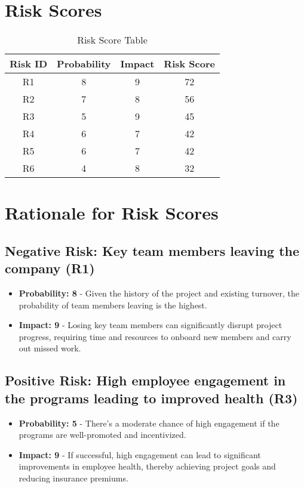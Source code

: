 \pagebreak
\section*{Risk Scores}
\begin{longtable}{|c|c|c|c|}
    \caption{Risk Score Table} \label{tab:title}
    \hline
    \textbf{Risk ID} & \textbf{Probability} & \textbf{Impact} & \textbf{Risk Score} \\
    \hline
    R1 & 8 & 9 & 72 \\
    \hline
    R2 & 7 & 8 & 56 \\
    \hline
    R3 & 5 & 9 & 45 \\
    \hline
    R4 & 6 & 7 & 42 \\
    \hline
    R5 & 6 & 7 & 42 \\
    \hline
    R6 & 4 & 8 & 32 \\
    \hline
\end{longtable}

\section*{Rationale for Risk Scores}

\subsection*{Negative Risk: Key team members leaving the company (R1)}
\begin{itemize}
    \item \textbf{Probability: 8} - Given the history of the project and existing turnover, the probability of team members leaving is the highest. 
    \item \textbf{Impact: 9} - Losing key team members can significantly disrupt project progress, requiring time and resources to onboard new members and carry out missed work.
\end{itemize}

\subsection*{Positive Risk: High employee engagement in the programs leading to improved health (R3)}
\begin{itemize}
    \item \textbf{Probability: 5} - There's a moderate chance of high engagement if the programs are well-promoted and incentivized. 
    \item \textbf{Impact: 9} - If successful, high engagement can lead to significant improvements in employee health, thereby achieving project goals and reducing insurance premiums.
\end{itemize}

